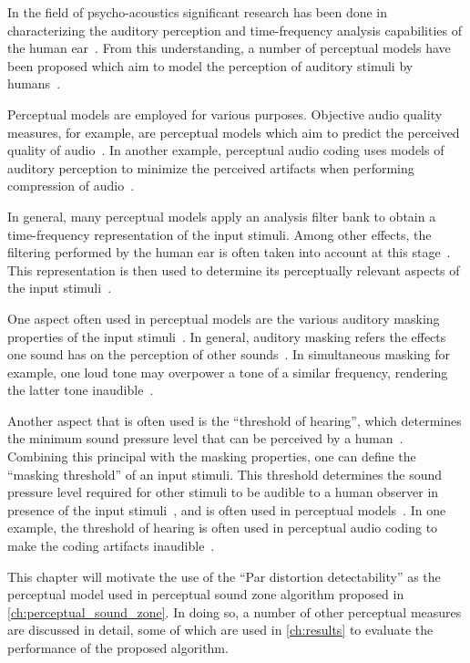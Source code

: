 In the field of psycho-acoustics significant research has been done in characterizing the auditory 
perception and time-frequency
analysis capabilities of the human ear~\cite{painter2000perceptual}.
From this understanding, a number of perceptual models have been proposed which aim to model the 
perception of auditory stimuli by humans~\cite{van2005perceptual}.

Perceptual models are employed for various purposes.
Objective audio quality measures, for example, are perceptual models which aim to predict the 
perceived quality of audio~\cite{torcoli2021objective}.
In another example, perceptual audio coding uses models of auditory perception to minimize the perceived artifacts when 
performing compression of audio~\cite{herre2019psychoacoustic}.

In general, many perceptual models apply an analysis filter bank to obtain a time-frequency representation 
of the input stimuli.
Among other effects, the filtering performed by the human ear is often taken 
into account at this stage~\cite{van2005perceptual, taal2012low}.
This representation is then used to determine its perceptually relevant aspects 
of the input stimuli~\cite{herre2019psychoacoustic}.

One aspect often used in perceptual models are the various auditory masking properties of the 
input stimuli~\cite{herre2019psychoacoustic}.
In general, auditory masking refers the effects one sound has on the perception of other sounds~\cite{painter2000perceptual}.
In simultaneous masking for example, one loud tone may overpower a tone of a similar frequency, rendering the 
latter tone inaudible~\cite{painter2000perceptual}.

Another aspect that is often used is the ``threshold of hearing'', which determines the minimum sound pressure level 
that can be perceived by a human~\cite{herre2019psychoacoustic}.
Combining this principal with the masking properties, one can define the ``masking threshold'' of an input stimuli.
This threshold determines the sound pressure level required for other stimuli to be audible to a human observer in presence 
of the input stimuli~\cite{painter2000perceptual}, and is often used in perceptual 
models~\cite{van2005perceptual, taal2012low}. 
In one example, the threshold of hearing is often used in perceptual audio coding to 
make the coding artifacts inaudible~\cite{herre2019psychoacoustic}.

This chapter will motivate the use of the ``Par distortion detectability'' as the perceptual model used in 
perceptual sound zone algorithm proposed in \autoref{ch:perceptual_sound_zone}.
In doing so, a number of other perceptual measures are discussed in detail, some of which are used 
in \autoref{ch:results} to evaluate the performance of the proposed algorithm.

